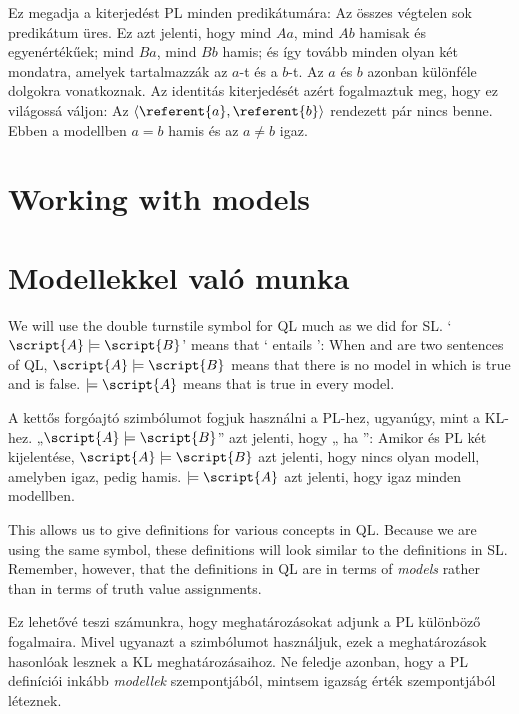 Ez megadja a kiterjedést PL minden predikátumára: Az összes végtelen sok predikátum üres. Ez azt jelenti, hogy mind $Aa$, mind $Ab$ hamisak és egyenértékűek; mind $Ba$, mind $Bb$ hamis; és így tovább minden olyan két mondatra, amelyek tartalmazzák az $a$-t és a $b$-t. Az $a$ és $b$ azonban különféle dolgokra vonatkoznak. Az identitás kiterjedését azért fogalmaztuk meg, hogy ez világossá váljon: Az $\langle\referent{a},\referent{b}\rangle$ rendezett pár nincs benne. Ebben a modellben $a=b$ hamis és az $a\neq b$ igaz. 





\section*{Working with models}
\section{Modellekkel való munka}
\label{sec.UsingModels}


We will use the double turnstile symbol for QL much as we did for SL. `$\script{A}\models\script{B}$' means that ` entails ': When  and  are two sentences of QL, $\script{A}\models\script{B}$ means that there is no model in which  is true and  is false. $\models\script{A}$ means that  is true in every model.

A kettős forgóajtó szimbólumot fogjuk használni a PL-hez, ugyanúgy, mint a KL-hez. „$\script{A}\models\script{B}$” azt jelenti, hogy „ ha ”: Amikor  és  PL két kijelentése, $\script{A}\models\script{B}$  azt jelenti, hogy nincs olyan modell, amelyben  igaz,  pedig hamis. $\models\script{A}$ azt jelenti, hogy   igaz minden modellben.

This allows us to give definitions for various concepts in QL. Because we are using the same symbol, these definitions will look similar to the definitions in SL. Remember, however, that the definitions in QL are in terms of \emph{models} rather than in terms of truth value assignments.

Ez lehetővé teszi számunkra, hogy meghatározásokat adjunk a PL különböző fogalmaira. Mivel ugyanazt a szimbólumot használjuk, ezek a meghatározások hasonlóak lesznek a KL meghatározásaihoz. Ne feledje azonban, hogy a PL definíciói inkább \emph{modellek} szempontjából, mintsem igazság érték szempontjából léteznek. 

